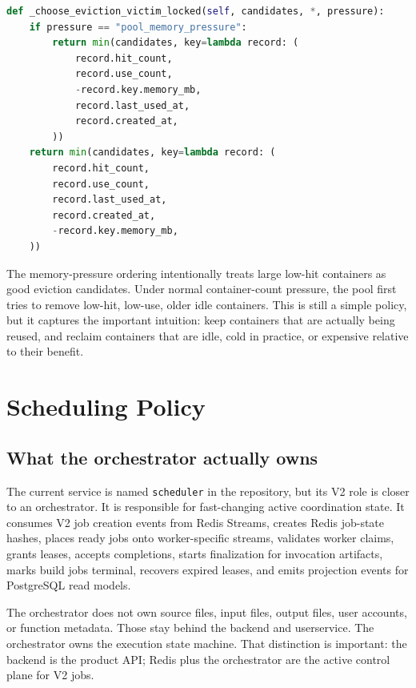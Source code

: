 \documentclass[12pt,a4paper]{report}
\newcommand{\service}[1]{\texttt{#1}}
\begin{document}
\begin{lstlisting}[language=Python,caption={Pressure-aware warm-pool victim selection from worker/warm\_pool.py.}]
def _choose_eviction_victim_locked(self, candidates, *, pressure):
    if pressure == "pool_memory_pressure":
        return min(candidates, key=lambda record: (
            record.hit_count,
            record.use_count,
            -record.key.memory_mb,
            record.last_used_at,
            record.created_at,
        ))
    return min(candidates, key=lambda record: (
        record.hit_count,
        record.use_count,
        record.last_used_at,
        record.created_at,
        -record.key.memory_mb,
    ))
\end{lstlisting}

The memory-pressure ordering intentionally treats large low-hit containers as
good eviction candidates. Under normal container-count pressure, the pool first
tries to remove low-hit, low-use, older idle containers. This is still a simple
policy, but it captures the important intuition: keep containers that are
actually being reused, and reclaim containers that are idle, cold in practice,
or expensive relative to their benefit.

\clearpage

\chapter{Scheduling Policy}

\section{What the orchestrator actually owns}

The current service is named \service{scheduler} in the repository, but its V2
role is closer to an orchestrator. It is responsible for fast-changing active
coordination state. It consumes V2 job creation events from Redis Streams,
creates Redis job-state hashes, places ready jobs onto worker-specific streams,
validates worker claims, grants leases, accepts completions, starts finalization
for invocation artifacts, marks build jobs terminal, recovers expired leases,
and emits projection events for PostgreSQL read models.

The orchestrator does not own source files, input files, output files, user
accounts, or function metadata. Those stay behind the backend and userservice.
The orchestrator owns the execution state machine. That distinction is
important: the backend is the product API; Redis plus the orchestrator are the
active control plane for V2 jobs.
\end{document}
